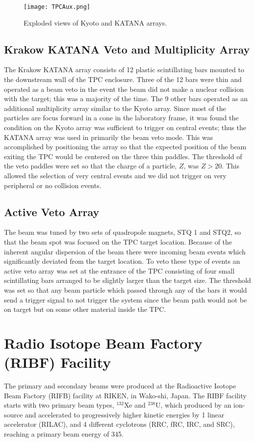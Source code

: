 \begin{figure}[!htb]
\texttt{[image: TPCAux.png]}
\label{fig:aux}
\caption{Exploded views of Kyoto and KATANA arrays.}
\end{figure}


\subsection{Krakow KATANA Veto and Multiplicity Array}
The Krakow KATANA array consists of 12 plastic scintillating bars mounted to the downstream wall of the TPC enclosure. Three of the 12 bars were thin and operated as a beam veto in the event the beam did not make a nuclear collision with the target; this was a majority of the time. The 9 other bars operated as an additional multiplicity array similar to the Kyoto array. Since most of the particles are focus forward in a cone in the laboratory frame, it was found the condition on the Kyoto array was sufficient to trigger on central events; thus the KATANA array was used in primarily the beam veto mode. This was accomplished by positioning the array so that the expected position of the beam exiting the TPC would be centered on the three thin paddles. The threshold of the veto paddles were set so that the charge of a particle, $Z$, was $Z > 20$. This allowed the selection of very central events and we did not trigger on very peripheral or no collision events. 


\subsection{Active Veto Array}
The beam was tuned by two sets of quadropole  magnets, STQ 1 and STQ2, so that the beam spot was focused on the TPC target location. Because of the inherent angular dispersion of the beam there were incoming beam events which significantly deviated from the target location. To veto these type of events an active veto array was set at the entrance of the TPC consisting of four small scintillating bars arranged to be slightly larger than the target size. The threshold was set so that any beam particle which passed through any of the bars it would send a trigger signal to not trigger the system since the beam path would not be on target but on some other material inside the TPC. 

\section{Radio Isotope Beam Factory (RIBF) Facility }
The primary and secondary beams were produced at the Radioactive Isotope Beam Factory (RIFB) facility at RIKEN, in Wako-shi, Japan. The RIBF facility starts with two primary beam types, ${}^{132}$Xe and ${}^{238}$U, which produced by an ion-source and accelerated to progressively higher kinetic energies by 1 linear accelerator (RILAC), and 4 different cyclotrons (RRC, fRC, IRC, and SRC), reaching a primary beam energy of \SI{345}{\MeVA}. 



